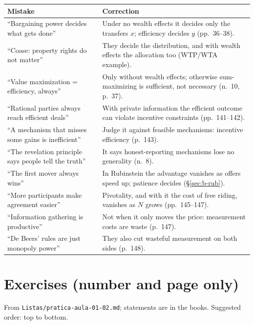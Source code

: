 \begin{center}
\begin{tabularx}{\linewidth}{>{\raggedright\arraybackslash}p{5.2cm}X}
\toprule
Mistake & Correction \\
\midrule
``Bargaining power decides what gets done'' & Under no wealth effects it decides only the transfers $x$; efficiency decides $y$ (pp.~36--38). \\
``Coase: property rights do not matter'' & They decide the distribution, and with wealth effects the allocation too (WTP/WTA example). \\
``Value maximization = efficiency, always'' & Only without wealth effects; otherwise sum-maximizing is sufficient, not necessary (n.~10, p.~37). \\
``Rational parties always reach efficient deals'' & With private information the efficient outcome can violate incentive constraints (pp.~141--142). \\
``A mechanism that misses some gains is inefficient'' & Judge it against feasible mechanisms: incentive efficiency (p.~143). \\
``The revelation principle says people tell the truth'' & It says honest-reporting mechanisms lose no generality (n.~8). \\
``The first mover always wins'' & In Rubinstein the advantage vanishes as offers speed up; patience decides (\S\ref{sec:b-rub}). \\
``More participants make agreement easier'' & Pivotality, and with it the cost of free riding, vanishes as $N$ grows (pp.~145--147). \\
``Information gathering is productive'' & Not when it only moves the price: measurement costs are waste (p.~147). \\
``De Beers' rules are just monopoly power'' & They also cut wasteful measurement on both sides (p.~148). \\
\bottomrule
\end{tabularx}
\end{center}

\section{Exercises (number and page only)}

From \texttt{Listas/pratica-aula-01-02.md}; statements are in the books. Suggested order: top to
bottom.

